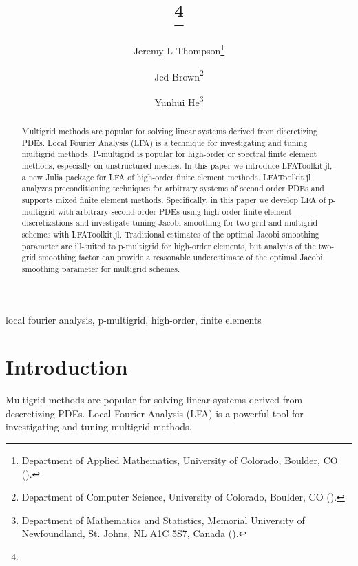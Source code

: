 \documentclass[review]{siamart190516}
\author{
Jeremy L Thompson\thanks{Department of Applied Mathematics, University of Colorado, Boulder, CO
  (\email{jeremy@jeremylt.org}).}
\and Jed Brown\thanks{Department of Computer Science, University of Colorado, Boulder, CO
  (\email{jed@jedbrown.org}).}
\and Yunhui He\thanks{Department of Mathematics and Statistics, Memorial University of Newfoundland, St. Johns, NL A1C 5S7, Canada
  (\email{yunhui.he@mun.ca}).}
}
\title{{\TheTitle}\thanks{\TheFunding}}
\begin{document}
\maketitle

\vspace{1cm}

\begin{abstract}
Multigrid methods are popular for solving linear systems derived from discretizing PDEs.
Local Fourier Analysis (LFA) is a technique for investigating and tuning multigrid methods.
P-multigrid is popular for high-order or spectral finite element methods, especially on unstructured meshes.
In this paper we introduce LFAToolkit.jl, a new Julia package for LFA of high-order finite element methods.
LFAToolkit.jl analyzes preconditioning techniques for arbitrary systems of second order PDEs and supports mixed finite element methods.
Specifically, in this paper we develop LFA of p-multigrid with arbitrary second-order PDEs using high-order finite element discretizations and investigate tuning Jacobi smoothing for two-grid and multigrid schemes with LFAToolkit.jl.
Traditional estimates of the optimal Jacobi smoothing parameter are ill-suited to p-multigrid for high-order elements, but analysis of the two-grid smoothing factor can provide a reasonable underestimate of the optimal Jacobi smoothing parameter for multigrid schemes.
\end{abstract}

\begin{keywords}
  local fourier analysis, p-multigrid, high-order, finite elements
\end{keywords}

\section{Introduction}\label{sec:intro}

Multigrid methods \cite{brandt1982guide, briggs2000multigrid, stuben1982multigrid} are popular for solving linear systems derived from descretizing PDEs.
Local Fourier Analysis (LFA) \cite{brandt1977multi, wienands2004practical} is a powerful tool for investigating and tuning multigrid methods.
\end{document}
